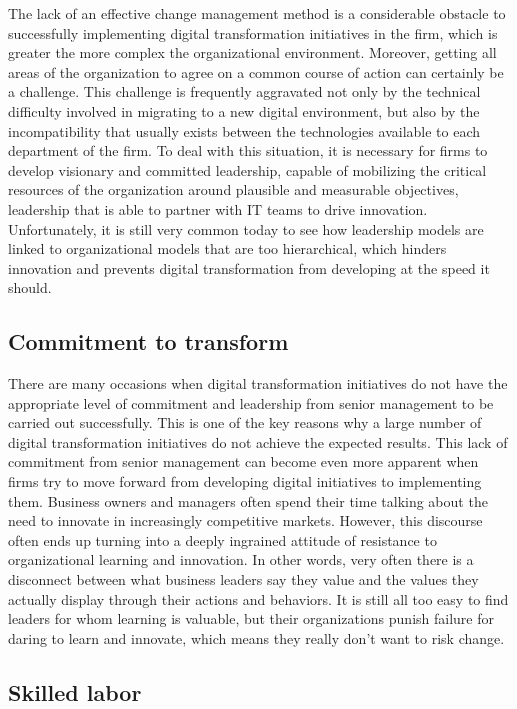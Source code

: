 \documentclass[
  letterpaper,
  DIV=11,
  numbers=noendperiod]{scrreprt}
\begin{document}
The lack of an effective change management method is a considerable
obstacle to successfully implementing digital transformation initiatives
in the firm, which is greater the more complex the organizational
environment. Moreover, getting all areas of the organization to agree on
a common course of action can certainly be a challenge. This challenge
is frequently aggravated not only by the technical difficulty involved
in migrating to a new digital environment, but also by the
incompatibility that usually exists between the technologies available
to each department of the firm. To deal with this situation, it is
necessary for firms to develop visionary and committed leadership,
capable of mobilizing the critical resources of the organization around
plausible and measurable objectives, leadership that is able to partner
with IT teams to drive innovation. Unfortunately, it is still very
common today to see how leadership models are linked to organizational
models that are too hierarchical, which hinders innovation and prevents
digital transformation from developing at the speed it should.

\hypertarget{commitment-to-transform}{%
\subsection{Commitment to transform}\label{commitment-to-transform}}

There are many occasions when digital transformation initiatives do not
have the appropriate level of commitment and leadership from senior
management to be carried out successfully. This is one of the key
reasons why a large number of digital transformation initiatives do not
achieve the expected results. This lack of commitment from senior
management can become even more apparent when firms try to move forward
from developing digital initiatives to implementing them. Business
owners and managers often spend their time talking about the need to
innovate in increasingly competitive markets. However, this discourse
often ends up turning into a deeply ingrained attitude of resistance to
organizational learning and innovation. In other words, very often there
is a disconnect between what business leaders say they value and the
values they actually display through their actions and behaviors. It is
still all too easy to find leaders for whom learning is valuable, but
their organizations punish failure for daring to learn and innovate,
which means they really don't want to risk change.

\hypertarget{skilled-labor}{%
\subsection{Skilled labor}\label{skilled-labor}}
\end{document}
